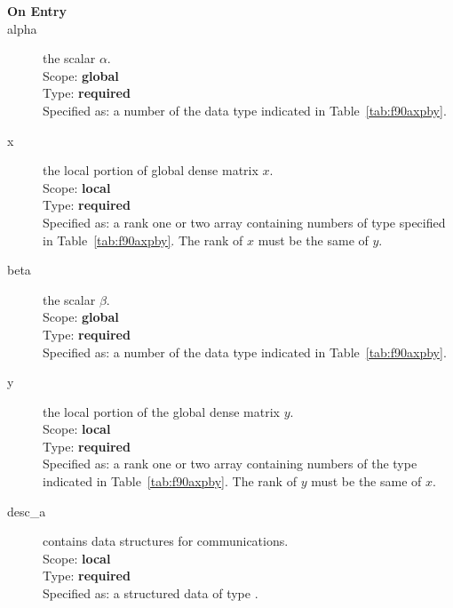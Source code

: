 \begin{description}
\item[\bf On Entry]
\item[alpha] the scalar $\alpha$.\\
Scope: {\bf global} \\
Type: {\bf required} \\
Specified as: a number of the data type indicated in Table~\ref{tab:f90axpby}.
\item[x] the local portion of global dense matrix
$x$.\\
Scope: {\bf local} \\
Type: {\bf required} \\
Specified as: a rank one or two array 
containing numbers of type 
specified in Table~\ref{tab:f90axpby}.  The rank of $x$ must be the same of $y$. 
\item[beta] the scalar $\beta$.\\
Scope: {\bf global} \\
Type: {\bf required} \\
Specified as: a number of the data type indicated in Table~\ref{tab:f90axpby}.
\item[y] the local portion of the global dense matrix
$y$. \\
Scope: {\bf local} \\
Type: {\bf required} \\
Specified as:  a rank one or two array containing numbers of the type 
indicated in Table~\ref{tab:f90axpby}.  The rank of $y$ must be the same of $x$. 
\item[desc\_a] contains data structures for communications.\\
Scope: {\bf local} \\
Type: {\bf required}\\
Specified as: a structured data of type \descdata.

\end{description}
